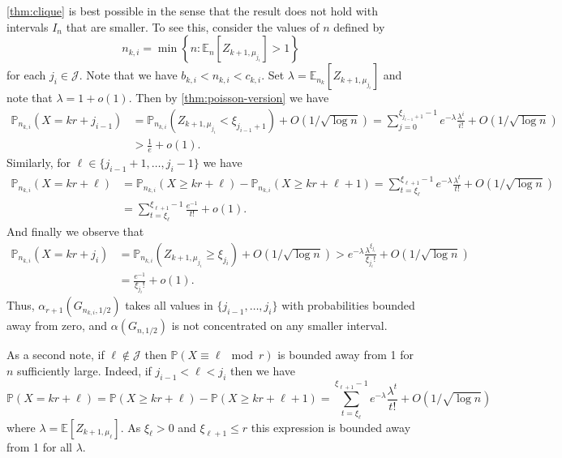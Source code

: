 \documentclass[11pt]{article}
\theoremstyle{definition}
\theoremstyle{remark}
\newcommand{\EE}{\mathbb{E}}
\newcommand{\cJ}{\mathcal{J}}
\newcommand{\PP}{\mathbb{P}}
\begin{document}
\cref{thm:clique} is best possible in the sense that the result does not hold 
with intervals $I_n$ that are smaller. To see this, consider the
values of $n$ defined by
$$  n_{k,i} = \min \left\{n : \EE_n[Z_{k+1, \mu_{j_i}}] > 1 \right\} $$
for each $j_i \in \cJ$.
Note that we have $ b_{k,i} < n_{k,i} < c_{k,i}$.
Set $ \lambda = \EE_{n_k}[Z_{k+1, \mu_{j_i}}] $ and note that 
$\lambda = 1+o(1)$. Then by \cref{thm:poisson-version} we have
\begin{align*} \PP_{n_{k,i}}( X = kr + j_{i-1} ) &= \PP_{n_{k,i}}( Z_{k+1, \mu_{j_i}} < \xi_{j_{i-1}+1}) + O(1/\sqrt{ \log n}) = \sum_{j=0}^{\xi_{j_{i-1}+1} -1} e^{-\lambda} \frac{ \lambda^i}{i!} + O( 1/\sqrt{\log n})\\
&> \frac{1}{e} + o(1).\end{align*}
Similarly, for $ \ell \in \{ j_{i-1}+1, \dots, j_i - 1\}$ we have
%
\begin{align*} \PP_{n_{k,i}}(X= kr + \ell)&=\PP_{n_{k,i}}(X \ge kr+ \ell) - \PP_{n_{k,i}}(X \ge kr+  \ell+1)= \sum_{t=\xi_\ell}^{\xi_{\ell+1}-1} e^{-\lambda}\frac{\lambda^t}{t!} + O(1/\sqrt{\log n}) \\
&= \sum_{t=\xi_\ell}^{\xi_{\ell+1}-1} \frac{e^{-1}}{t!} + o(1).
\end{align*}
And finally we observe that
\begin{align*} \PP_{n_{k,i}}(X=kr + j_i) &= \PP_{n_{k,i}}( Z_{k+1, \mu_{j_i}} \ge\xi_{j_i} ) + O( 1/ \sqrt{ \log n})> 
e^{-\lambda}\frac{\lambda^{ \xi_{j_i}}}{\xi_{j_i}!} + O(1/\sqrt{\log n})\\
&= \frac{e^{-1}}{ \xi_{j_i}!} + o(1).
\end{align*}
Thus, $\alpha_{r+1}( G_{n_{k,i},1/2})$ takes all values in $\{ j_{i-1}, \dots, j_i\} $ with probabilities
bounded away from zero, and $ \alpha( G_{n,1/2})$ is not concentrated on any smaller interval.


As a second note, if $ \ell \notin \cJ$ then $ \PP( X \equiv \ell \mod r)$ is bounded away from 1 for
$n$ sufficiently large. Indeed, if $ j_{i-1} < \ell < j_i $ then we have 
\[ \PP(X=kr+\ell)=\PP(X \ge kr+ \ell) - \PP(X \ge kr+ \ell+1) = \sum_{t=\xi_\ell}^{\xi_{\ell+1}-1} e^{-\lambda}\frac{\lambda^t}{t!} + O(1/\sqrt{\log n})
\]
where $\lambda = \EE[ Z_{k+1, \mu_\ell}]$. As $\xi_\ell >0$ and $ \xi_{\ell +1} \le r$ 
this expression is bounded away from 1 for all $\lambda$.
\end{document}
